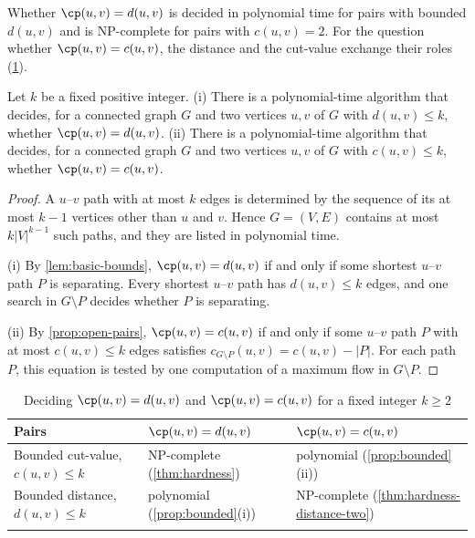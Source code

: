 Whether $\cp(u, v) = d(u, v)$ is decided in polynomial time for pairs with bounded $d(u, v)$ and is NP-complete for pairs with $c(u, v) = 2$.
For the question whether $\cp(u, v) = c(u, v)$, the distance and the cut-value exchange their roles (\cref{tab:bounded}).

\begin{proposition}
\label{prop:bounded}
Let $k$ be a fixed positive integer.
(i) There is a polynomial-time algorithm that decides, for a connected graph $G$ and two vertices $u, v$ of $G$ with $d(u, v) \leq k$, whether $\cp(u, v) = d(u, v)$.
(ii) There is a polynomial-time algorithm that decides, for a connected graph $G$ and two vertices $u, v$ of $G$ with $c(u, v) \leq k$, whether $\cp(u, v) = c(u, v)$.
\end{proposition}

\begin{proof}
A $u$--$v$ path with at most $k$ edges is determined by the sequence of its at most $k - 1$ vertices other than $u$ and $v$.
Hence $G = (V, E)$ contains at most $k|V|^{k-1}$ such paths, and they are listed in polynomial time.

(i) By \cref{lem:basic-bounds}, $\cp(u, v) = d(u, v)$ if and only if some shortest $u$--$v$ path $P$ is separating.
Every shortest $u$--$v$ path has $d(u, v) \leq k$ edges, and one search in $G \setminus P$ decides whether $P$ is separating.

(ii) By \cref{prop:open-pairs}, $\cp(u, v) = c(u, v)$ if and only if some $u$--$v$ path $P$ with at most $c(u, v) \leq k$ edges satisfies $c_{G \setminus P}(u, v) = c(u, v) - |P|$.
For each path $P$, this equation is tested by one computation of a maximum flow in $G \setminus P$.
\end{proof}

\begin{table}[tb]
\caption{Deciding $\cp(u, v) = d(u, v)$ and $\cp(u, v) = c(u, v)$ for a fixed integer $k \geq 2$}\label{tab:bounded}
\begin{tabular}{@{}lll@{}}
\toprule
Pairs & $\cp(u, v) = d(u, v)$ & $\cp(u, v) = c(u, v)$ \\
\midrule
Bounded cut-value, $c(u, v) \leq k$ & NP-complete (\cref{thm:hardness}) & polynomial (\cref{prop:bounded}(ii)) \\
Bounded distance, $d(u, v) \leq k$ & polynomial (\cref{prop:bounded}(i)) & NP-complete (\cref{thm:hardness-distance-two}) \\
\botrule
\end{tabular}
\end{table}


